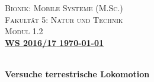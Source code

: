 \begin{titlepage}
\begin{minipage}[c]{9cm}
\vspace{0pt}
\textsc{\large Bionik: Mobile Systeme (M.Sc.)}\\
\textsc{Fakultät 5: Natur und Technik}\\
\textsc{\small Modul 1.2}\\
[0.5cm]
\underline{\large \textbf{WS 2016/17}\hspace{10.5cm} \textbf{\today}}\\
\end{minipage}
\begin{minipage}[c]{6cm}
\vspace{0pt}
\vspace{1cm}
\end{minipage}

\begin{center}
\vspace{5cm}


\\
[1.5cm]

\huge \bfseries Versuche terrestrische Lokomotion\\
[0.4cm]

\vfill

\end{center}
\normalsize
{}\\
{}\\
{}\\
\end{titlepage}